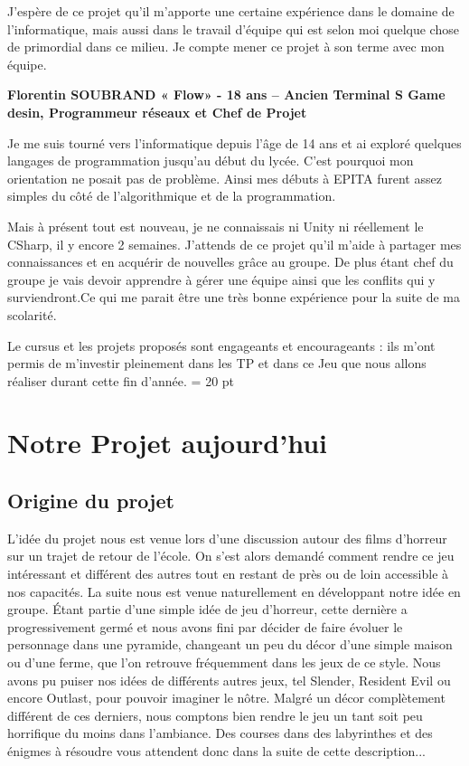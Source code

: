\documentclass[12pt,a4paper]{article}
\begin{document}
J'espère de ce projet qu'il m'apporte une certaine expérience dans le domaine de l'informatique, mais aussi dans le travail d'équipe qui est selon moi quelque chose de primordial dans ce milieu. Je compte mener ce projet à son terme avec mon équipe.

\begin{center}
\textbf{Florentin SOUBRAND « Flow» - 18 ans – Ancien Terminal S \newline
Game desin, Programmeur réseaux et Chef de Projet}
\end{center}
	Je me suis tourné vers l'informatique depuis l'âge de 14 ans et ai exploré quelques langages de programmation jusqu'au début du lycée. C'est pourquoi mon orientation ne posait pas de problème. Ainsi mes débuts à EPITA furent assez simples du côté de l'algorithmique et de la programmation.

	Mais à présent tout est nouveau, je ne connaissais ni Unity ni réellement le CSharp, il y encore 2 semaines. J'attends de ce projet qu'il m'aide à partager mes connaissances et en acquérir de nouvelles grâce au groupe. De plus étant chef du groupe je vais devoir apprendre à gérer une équipe ainsi que les conflits qui y surviendront.Ce qui me parait être une très bonne expérience pour la suite de ma scolarité.
	
	Le cursus et les projets proposés sont engageants et encourageants : ils m'ont permis de m'investir pleinement dans les TP et dans ce Jeu que nous allons réaliser durant cette fin d'année.
\baselineskip = 20 pt
\newpage
\section{Notre Projet aujourd'hui}
\subsection{Origine du projet}
L'idée du projet nous est venue lors d'une discussion autour des films
d'horreur sur un trajet de retour de l'école. On s'est alors demandé comment rendre ce
jeu intéressant et différent des autres tout en restant de près ou de loin accessible à nos capacités.
La suite nous est venue naturellement en développant
notre idée en groupe. Étant partie d'une simple idée de jeu d'horreur, cette dernière a progressivement germé et
nous avons fini par décider de faire évoluer le personnage dans une pyramide, changeant un peu du
décor d'une simple maison ou d'une ferme, que l'on retrouve fréquemment dans les jeux de ce style.
Nous avons pu puiser nos idées de différents autres jeux, tel Slender, Resident Evil ou encore Outlast,
pour pouvoir imaginer le nôtre. Malgré un décor complètement différent de ces derniers, nous
comptons bien rendre le jeu un tant soit peu horrifique du moins dans l'ambiance.
Des courses dans des labyrinthes et des énigmes à résoudre vous attendent donc dans la suite de cette
description...
\end{document}
